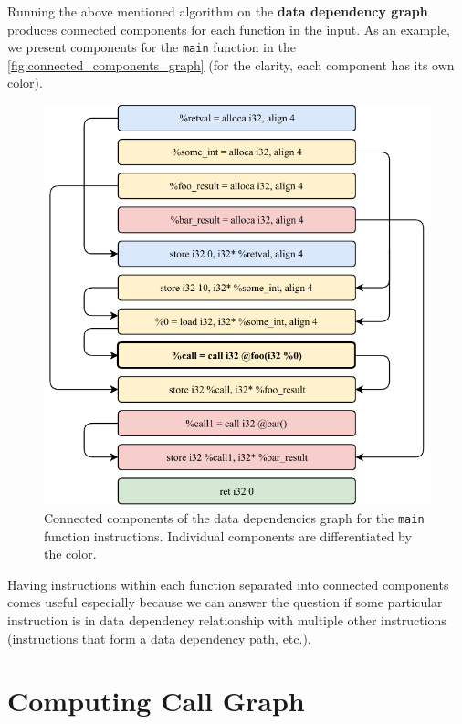 \documentclass[12pt, twoside]{fithesis2}
\renewcommand{\_}{\leavevmode \kern0.07em\vbox{\hrule width0.4em}}
\begin{document}
Running the above mentioned algorithm on the \textbf{data dependency graph}
produces connected components for each function in the input.
As an example, we present components for the \texttt{main} function
in the \autoref{fig:connected_components_graph} (for the clarity, each component
has its own color).

\begin{figure}[ht]
    \centering
    \includegraphics[]{images/main_components.pdf}
    \caption{Connected components of the data dependencies graph
    for the \texttt{main} function instructions. Individual components
    are differentiated by the color.}
    \label{fig:connected_components_graph}
\end{figure}


Having instructions within each function separated into connected components
comes useful especially because we can answer the question if some particular
instruction is in data dependency relationship with multiple other instructions
(instructions that form a data dependency path, etc.).

\section{Computing Call Graph}
\label{sec:design-callgraph}
\end{document}
